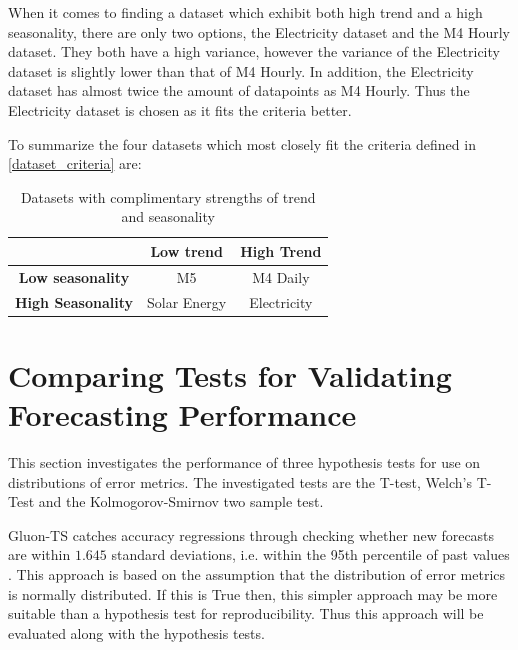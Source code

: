 When it comes to finding a dataset which exhibit both high trend and a high seasonality, there are only two options, the Electricity dataset and the M4 Hourly dataset. They both have a high variance, however the variance of the Electricity dataset is slightly lower than that of M4 Hourly. In addition, the Electricity dataset has almost twice the amount of datapoints as M4 Hourly. Thus the Electricity dataset is chosen as it fits the criteria better.


To summarize the four datasets which most closely fit the criteria defined in \ref{dataset_criteria} are:

\begin{table}[htp]
  \centering
  \begin{tabular}{ccc}
                              & \textbf{Low trend} & \textbf{High Trend} \\
    \hline
    \textbf{Low seasonality}  & M5                 & M4 Daily            \\
    \hline
    \textbf{High Seasonality} & Solar Energy       & Electricity         \\
  \end{tabular}
  \caption{Datasets with complimentary strengths of trend and seasonality}
  \label{fig:representative_subset_of_datasets}
\end{table}

\section{Comparing Tests for Validating Forecasting Performance}
\label{sec:compairing_hypothesis_tests}
This section investigates the performance of three hypothesis tests for use on distributions of error metrics. The investigated tests are the T-test, Welch’s T-Test and the Kolmogorov-Smirnov two sample test.

Gluon-TS catches accuracy regressions through checking whether new forecasts are within \(1.645\) standard deviations, i.e. within the 95th percentile of past values \cite{gluonts-github}. This approach is based on the assumption that the distribution of error metrics is normally distributed. If this is True then, this simpler approach may be more suitable than a hypothesis test for reproducibility. Thus this approach will be evaluated along with the hypothesis tests.


